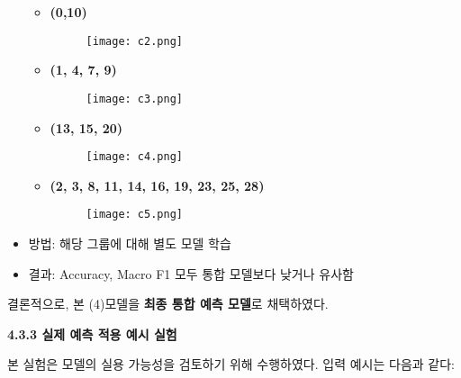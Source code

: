 \documentclass[sigconf]{acmart}
\begin{document}
\begin{CJK}{UTF8}{mj}
\begin{itemize}
\begin{itemize}
  \vspace{5em}
  \item \textbf{(0,10)}
    \vspace{-1em}
    \begin{figure}[H]
    \centering
    \texttt{[image: c2.png]}
    \label{fig:integrated_cluster_1}
    \end{figure}
  \vspace{-0.5em}
  \item \textbf{(1, 4, 7, 9)}
    \vspace{-1em}
    \begin{figure}[H]
    \centering
    \texttt{[image: c3.png]}
    \label{fig:integrated_cluster_2}
    \end{figure}
  \vspace{-0.5em}
  \item \textbf{(13, 15, 20)}
    \vspace{-1em}
    \begin{figure}[H]
    \centering
    \texttt{[image: c4.png]}
    \label{fig:integrated_cluster_3}
    \end{figure}
  \vspace{-0.5em}
  \item \textbf{(2, 3, 8, 11, 14, 16, 19, 23, 25, 28)}
    \vspace{-1em}
    \begin{figure}[H]
    \centering
    \texttt{[image: c5.png]}
    \label{fig:integrated_cluster_4}
    \end{figure}
\end{itemize}

  \item 방법: 해당 그룹에 대해 별도 모델 학습
  \item 결과: Accuracy, Macro F1 모두 통합 모델보다 낮거나 유사함
\end{itemize}

\vspace{0.5em}
결론적으로, 본 (4)모델을 \textbf{최종 통합 예측 모델}로 채택하였다. 

\vspace{1em}
\noindent\textbf{4.3.3 실제 예측 적용 예시 실험}\par
본 실험은 모델의 실용 가능성을 검토하기 위해 수행하였다.  
입력 예시는 다음과 같다:


\end{CJK}
\end{document}
